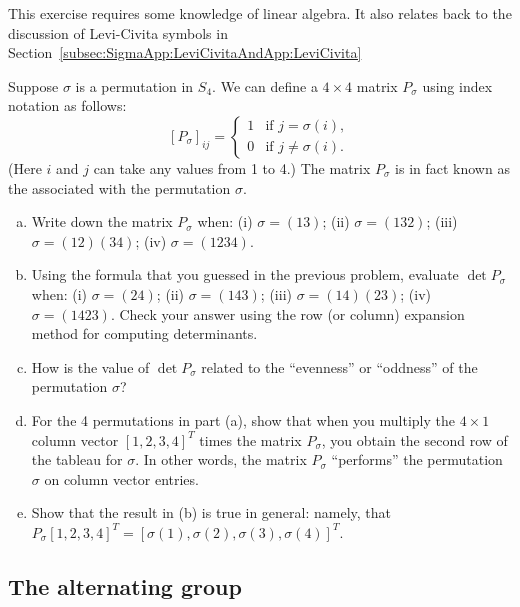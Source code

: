 \begin{exercise}{}
This exercise requires some knowledge of linear algebra. It also relates back to the discussion of Levi-Civita symbols in  Section~\ref{subsec:SigmaApp:LeviCivitaAndApp:LeviCivita}

 Suppose $\sigma$ is a permutation in $S_4$. We can define a $4 \times 4$ matrix $P_{\sigma}$ using index notation as follows:  
\[ [P_{\sigma}]_{ij} = \begin{cases} 1 &\text{if } j = \sigma(i), \\ 
 0 &\text{if } j \neq  \sigma(i).  \end{cases} \]
(Here $i$ and $j$ can take any values from 1 to 4.)  The matrix $P_{\sigma}$ is in fact known as the  associated with the permutation $\sigma$.
\begin{enumerate}[(a)]
\item
Write down the matrix $P_{\sigma}$ when: (i) $\sigma = (13)$; (ii) $\sigma = (132)$; (iii) $\sigma = (12)(34)$; (iv)  $\sigma = (1234)$.
\item
Using the formula that you guessed in the previous problem, evaluate $\det P_{\sigma}$ when: (i) $\sigma = (24)$; (ii) $\sigma = (143)$; (iii) $\sigma = (14)(23)$; (iv)  $\sigma = (1423)$. Check your answer using the row (or column) expansion method for computing determinants.
\item
How is the value of $\det P_{\sigma}$  related to the ``evenness'' or ``oddness'' of the permutation $\sigma$?
\item
For the 4 permutations in part (a), show that when you multiply the $4 \times 1$ column vector $[1,2,3,4]^T$ times the matrix $P_{\sigma}$, you obtain the second row of the tableau for $\sigma$.  In other words, the matrix $P_{\sigma}$ ``performs'' the permutation $\sigma$ on column vector entries.
\item
Show that the result in (b) is true in general: namely, that  $P_{\sigma}[1,2,3,4]^T = [\sigma(1),\sigma(2),\sigma(3),\sigma(4)]^T.$ 	
\end{enumerate}
\end{exercise}



\subsection{The alternating group}
\label{sec:Permutations:OtherGroups:AlternatingGroup}


